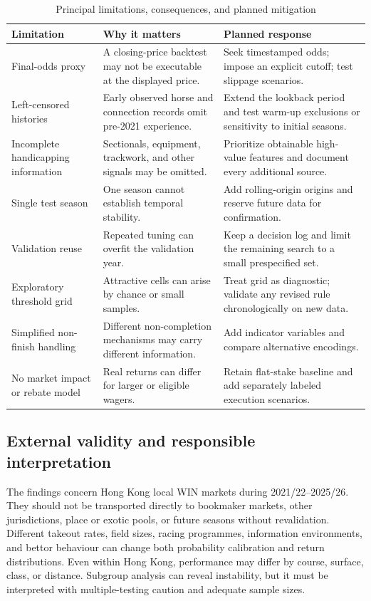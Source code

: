 \begin{table}[htbp]
\centering
\caption{Principal limitations, consequences, and planned mitigation}\label{tab:limitations}
\small
\begin{tabularx}{\textwidth}{L{3.2cm} Y Y}
\toprule
\textbf{Limitation} & \textbf{Why it matters} & \textbf{Planned response} \\
\midrule
Final-odds proxy & A closing-price backtest may not be executable at the displayed price. & Seek timestamped odds; impose an explicit cutoff; test slippage scenarios. \\
\addlinespace
Left-censored histories & Early observed horse and connection records omit pre-2021 experience. & Extend the lookback period and test warm-up exclusions or sensitivity to initial seasons. \\
\addlinespace
Incomplete handicapping information & Sectionals, equipment, trackwork, and other signals may be omitted. & Prioritize obtainable high-value features and document every additional source. \\
\addlinespace
Single test season & One season cannot establish temporal stability. & Add rolling-origin origins and reserve future data for confirmation. \\
\addlinespace
Validation reuse & Repeated tuning can overfit the validation year. & Keep a decision log and limit the remaining search to a small prespecified set. \\
\addlinespace
Exploratory threshold grid & Attractive cells can arise by chance or small samples. & Treat grid as diagnostic; validate any revised rule chronologically on new data. \\
\addlinespace
Simplified non-finish handling & Different non-completion mechanisms may carry different information. & Add indicator variables and compare alternative encodings. \\
\addlinespace
No market impact or rebate model & Real returns can differ for larger or eligible wagers. & Retain flat-stake baseline and add separately labeled execution scenarios. \\
\bottomrule
\end{tabularx}
\end{table}

\subsection{External validity and responsible interpretation}\label{sec:discussion-external}
The findings concern Hong Kong local WIN markets during 2021/22--2025/26. They should not be transported directly to bookmaker markets, other jurisdictions, place or exotic pools, or future seasons without revalidation. Different takeout rates, field sizes, racing programmes, information environments, and bettor behaviour can change both probability calibration and return distributions. Even within Hong Kong, performance may differ by course, surface, class, or distance. Subgroup analysis can reveal instability, but it must be interpreted with multiple-testing caution and adequate sample sizes.

